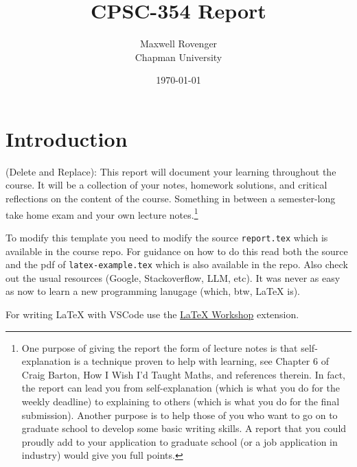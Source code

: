 \documentclass{article}
\title{CPSC-354 Report}
\author{Maxwell Rovenger  \\ Chapman University}
\date{\today}
\theoremstyle{theorem}
\theoremstyle{definition}
\theoremstyle{remark}
\begin{document}
\maketitle

\begin{abstract}
\end{abstract}

\setcounter{tocdepth}{3}
\tableofcontents

\section{Introduction}\label{intro}

(Delete and Replace): This report will document your learning throughout the course. It will be a collection of your notes, homework solutions, and critical reflections on the content of the course. Something in between a semester-long take home exam and your own lecture notes.\footnote{One purpose of giving the report the form of lecture notes is that self-explanation is a technique proven to help with learning, see Chapter 6 of Craig Barton, How I Wish I'd Taught Maths, and references therein. In fact, the report can lead you from self-explanation (which is what you do for the weekly deadline) to explaining to others (which is what you do for the final submission). Another purpose is to help those of you who want to go on to graduate school to develop some basic writing skills. A report that you could proudly add to your application to graduate school (or a job application in industry) would give you full points.}

To modify this template you need to modify the source \texttt{report.tex} which is available in the course repo. For guidance on how to do this read both the source and the pdf of \texttt{latex-example.tex} which is also available in the repo. Also check out the usual resources (Google, Stackoverflow, LLM, etc). It was never as easy as now to learn a new programming lanugage (which, btw, \LaTeX{} is).

For writing \LaTeX{} with VSCode use the \href{https://marketplace.visualstudio.com/items?itemName=James-Yu.latex-workshop}{LaTeX Workshop} extension. 
\end{document}
